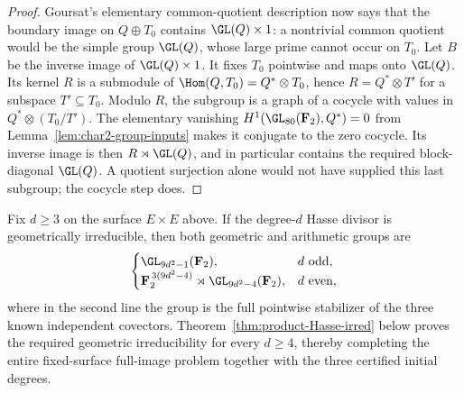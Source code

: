 \begin{proof}
Goursat's elementary common-quotient description now says that
the boundary image on $Q\oplus T_0$ contains
$\GL(Q)\times1$: a nontrivial common quotient would be the
simple group $\GL(Q)$, whose large prime cannot occur on $T_0$.
Let $B$ be the inverse image of $\GL(Q)\times1$.
It fixes $T_0$ pointwise and maps onto $\GL(Q)$.
Its kernel $R$ is a submodule of
$\Hom(Q,T_0)=Q^*\otimes T_0$, hence
$R=Q^*\otimes T'$ for a subspace $T'\subseteq T_0$.
Modulo $R$, the subgroup is a graph of a cocycle with values in
$Q^*\otimes(T_0/T')$.  The elementary vanishing
$H^1(\GL_{80}(\mathbf F_2),Q^*)=0$ from
Lemma~\ref{lem:char2-group-inputs} makes it conjugate to the
zero cocycle.  Its inverse image is then
$R\rtimes\GL(Q)$, and in particular contains the required
block-diagonal $\GL(Q)$.  A quotient surjection alone would
not have supplied this last subgroup; the cocycle step does.
\end{proof}

\begin{theorem}
\label{thm:product-full-group-if-hasse-irreducible}
Fix $d\ge3$ on the surface $E\times E$ above.
If the degree-$d$ Hasse divisor is geometrically irreducible,
then both geometric and arithmetic groups are
\[
 \begin{cases}
 \GL_{9d^2-1}(\mathbf F_2),&d\text{ odd},\\
 \mathbf F_2^{\,3(9d^2-4)}\rtimes\GL_{9d^2-4}(\mathbf F_2),
       &d\text{ even},
 \end{cases}
\]
where in the second line the group is the full pointwise
stabilizer of the three known independent covectors.
Theorem~\ref{thm:product-Hasse-irred} below proves the required
geometric irreducibility for every $d\ge4$, thereby completing
the entire fixed-surface full-image problem together with the
three certified initial degrees.
\end{theorem}

